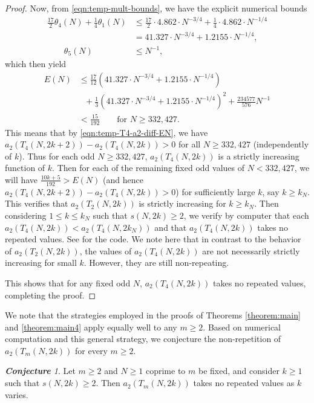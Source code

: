 \documentclass[11pt,letterpaper,reqno]{amsart}
\numberwithin{figure}{section}
\numberwithin{table}{section}
\theoremstyle{definition}
\theoremstyle{plain}
\newcommand{\lrp}[1]{\left(#1\right)}
\theoremstyle{definition}
\theoremstyle{definition}
\theoremstyle{remark}
\newtheorem{conjecture}[theorem]{\bf Conjecture}
\numberwithin{equation}{section}
\begin{document}
\begin{proof}
Now, from \eqref{eqn:temp-mult-bounds}, we have the explicit numerical bounds
\begin{align}
    \frac{17}{2} \theta_4(N) + \frac14 \theta_1(N) &\leq \frac{17}{2} \cdot 4.862 \cdot N^{-3/4} + \frac{1}{4} \cdot 4.862 \cdot N^{-1/4} \\
    &= 41.327 \cdot N^{-3/4} + 1.2155 \cdot N^{-1/4}, \\
     \qquad \theta_5(N) &\leq N^{-1},
\end{align}
which then yield
\begin{align}
    E(N) &\leq \frac{17}{12} \lrp{41.327 \cdot N^{-3/4} + 1.2155 \cdot N^{-1/4}} \\
    & \ \ \ + \frac13 \lrp{41.327 \cdot N^{-3/4} + 1.2155 \cdot N^{-1/4}}^2 + \frac{234577}{576} N^{-1} \\
    &< \frac{15}{192} \qquad \text{for } N \geq 332,\!427.
\end{align}
This means that by \eqref{eqn:temp-T4-a2-diff-EN}, we have $a_2(T_4(N, 2k + 2)) - a_2(T_4(N, 2k)) > 0$ for all $N \geq 332,\!427$ (independently of $k$). Thus for each odd  $N \geq 332,\!427$, $a_2(T_4(N, 2k))$ is a strictly increasing function of $k$. Then for each of the remaining fixed odd values of $N < 332,\!427$, we will have $\frac{10k+5}{192} > E(N)$ (and hence $a_2(T_4(N, 2k + 2)) - a_2(T_4(N, 2k)) > 0$) for sufficiently large $k$, say $k \geq k_N$. 
This verifies that $a_2(T_2(N, 2k))$ is strictly increasing for $k \geq k_N$.
Then considering $1 \leq k \leq k_N$ such that $s(N,2k) \ge 2$, we verify by computer that each $a_2(T_4(N, 2k)) < a_2(T_4(N, 2k_N))$ and that $a_2(T_4(N, 2k))$ takes no repeated values. See \cite{ross-code} for the code. We note here that in contrast to the behavior of $a_2(T_2(N, 2k))$, the values of $a_2(T_4(N, 2k))$ are not necessarily strictly increasing for small $k$. However, they are still non-repeating.

This shows that for any fixed odd $N$, $a_2(T_4(N,2k))$ takes no repeated values, completing the proof.
\end{proof}



We note that the strategies employed in the proofs of Theorems \ref{theorem:main} and \ref{theorem:main4} apply equally well to any $m \ge 2$.
Based on numerical computation \cite{ross-code} and this general strategy, we conjecture the non-repetition of $a_2(T_m(N,2k))$ for every $m \ge 2$.  
\begin{conjecture} \label{conj:nonrepetition}
Let $m \geq 2$ and $N \ge 1$ coprime to $m$ be fixed, and consider $k \ge 1$ such that $s(N,2k) \ge 2$. Then $a_2(T_m(N,2k))$ takes no repeated values as $k$ varies.
\end{conjecture}
\end{document}
